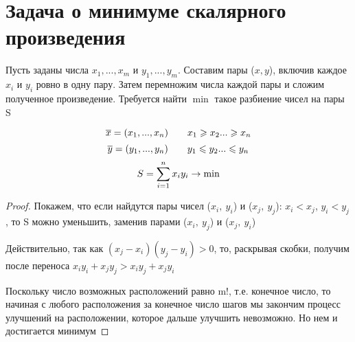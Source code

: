 \documentclass[discrete.tex]{subfiles}
\begin{document}
\section{Задача о минимуме скалярного произведения}
Пусть заданы числа $x_1,...,x_m$ и $y_1,...,y_m$. Составим пары ($x,y$), включив каждое $x_i$ и $y_i$ ровно в одну пару. Затем перемножим числа каждой пары и сложим полученное произведение. Требуется найти $\min$ такое разбиение чисел на пары S
\begin{Theorem}
  \[\overline{x} = (x_1,...,x_n) \qquad x_1 \geqslant x_2 ... \geqslant x_n\]
  \[\overline{y} = (y_1,...,y_n) \qquad y_1 \leqslant y_2 ... \leqslant y_n\]
  \[S = \sum_{i=1}^n x_i y_i \rightarrow \min\]
\end{Theorem}

\begin{proof}
  Покажем, что если найдутся пары чисел ($x_i,\ y_i$) и ($x_j,\ y_j$): $x_i < x_j$, $y_i < y_j$, то S можно уменьшить, заменив парами ($x_i,\ y_j$) и ($x_j,\ y_i$)

  Действительно, так как $(x_j-x_i)(y_j-y_i)>0$, то, раскрывая скобки, получим после переноса $x_i y_i + x_j y_j > x_i y_j + x_j y_i$

  Поскольку число возможных расположений равно m!, т.е. конечное число, то начиная с любого расположения за конечное число шагов мы закончим процесс улучшений на расположении, которое дальше улучшить невозможно. Но нем и достигается минимум
\end{proof}
\end{document}

